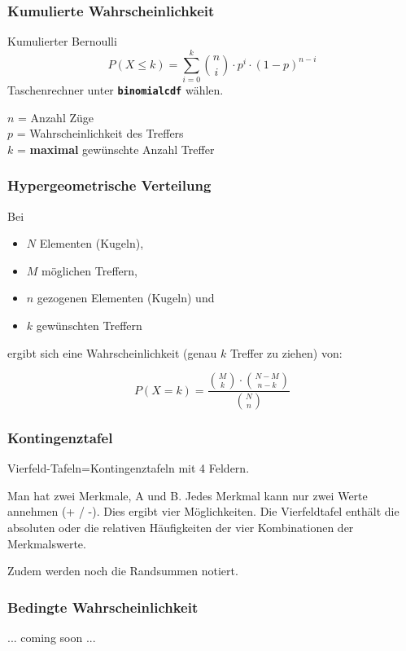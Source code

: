 \begin{multicols}{2}
\subsubsection{Kumulierte Wahrscheinlichkeit}

\begin{gesetz}{Kumulierter Bernoulli}{}
$$P(X\le k) = \sum_{i=0}^{k}{n \choose i}\cdot{}p^i\cdot{}(1-p)^{n-i}$$
Taschenrechner
unter  \textbf{\texttt{binomialcdf}} wählen.

$n$ = Anzahl Züge\\
$p$ = Wahrscheinlichkeit des Treffers\\
$k$ = \textbf{maximal} gewünschte Anzahl Treffer
\end{gesetz}

\subsubsection{Hypergeometrische Verteilung}
Bei
\begin{itemize}
\item $N$ Elementen (Kugeln),
\item $M$ möglichen Treffern,
\item $n$ gezogenen Elementen (Kugeln) und 
\item $k$ gewünschten Treffern
\end{itemize}
ergibt sich eine Wahrscheinlichkeit (genau $k$ Treffer zu ziehen) von:

$$P(X=k) = \frac{ {M \choose k} \cdot {{N-M}  \choose {n-k}} }{{N \choose n}}$$



\subsubsection{Kontingenztafel}
Vierfeld-Tafeln=Kontingenztafeln mit 4 Feldern.

Man hat zwei Merkmale, A und B. Jedes Merkmal kann nur zwei Werte
annehmen (+ / -). Dies ergibt vier Möglichkeiten. Die Vierfeldtafel
enthält die absoluten oder die relativen Häufigkeiten der vier
Kombinationen der Merkmalswerte.

Zudem werden noch die Randsummen notiert.


\subsubsection{Bedingte Wahrscheinlichkeit}
... coming soon ...

\end{multicols}


